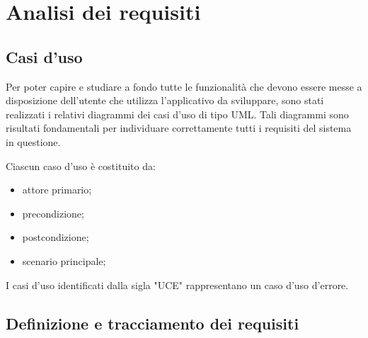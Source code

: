 \chapter{Analisi dei requisiti}
\label{cap:analisi-requisiti}


\setlength{\parskip}{3ex}

\section{Casi d'uso}
Per poter capire e studiare a fondo tutte le funzionalità che devono essere messe a disposizione dell'utente che utilizza l'applicativo da sviluppare, sono stati realizzati i relativi diagrammi dei casi d'uso di tipo UML. Tali diagrammi sono risultati fondamentali per individuare correttamente tutti i requisiti del sistema in questione.

\setlength{\parskip}{3ex}

\noindent Ciascun caso d'uso è costituito da:
\begin{itemize}
\item attore primario;
\item precondizione;
\item postcondizione;
\item scenario principale;
\end{itemize}

\setlength{\parskip}{3ex}

\noindent I casi d'uso identificati dalla sigla "UCE" rappresentano un caso d'uso d'errore.

\pagebreak


\section{Definizione e tracciamento dei requisiti}

